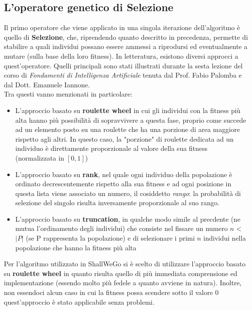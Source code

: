     \subsection{L'operatore genetico di Selezione}
        Il primo operatore che viene applicato in una singola iterazione dell'algoritmo è quello di \textbf{Selezione}, che, riprendendo quanto descritto in precedenza, permette di stabilire a quali individui possano essere ammessi a riprodursi ed eventualmente a mutare (sulla base della loro fitness). In letteratura, esistono diversi approcci a quest'operatore. Quelli principali sono stati illustrati durante la sesta lezione del corso di \textit{Fondamenti di Intelligenza Artificiale} tenuta dal Prof. Fabio Palomba e dal Dott. Emanuele Iannone. \\
        Tra questi vanno menzionati in particolare:

        \begin{itemize}
            \item L'approccio basato su \textbf{roulette wheel} in cui gli individui con la fitness più alta hanno più possibilità di sopravvivere a questa fase, proprio come succede ad un elemento posto su una roulette che ha una porzione di area maggiore rispetto agli altri. In questo caso, la "porzione" di roulette dedicata ad un individuo è direttamente proporzionale al valore della sua fitness (normalizzata in $[0, 1]$)
            \item L'approccio basato su \textbf{rank}, nel quale ogni individuo della popolazione è ordinato decrescentemente rispetto alla sua fitness e ad ogni posizione in questa lista viene associato un numero, il cosiddetto \textit{rango}: la probabilità di selezione del singolo risulta inversamente proporzionale al suo rango.
            \item L'approccio basato su \textbf{truncation}, in qualche modo simile al precdente (ne mutua l'ordinamento degli individui) che consiste nel fissare un numero $n$ < $|P|$ (se P rappresenta la popolazione) e di selezionare i primi $n$ individui nella popolazione che hanno la fitness più alta
        \end{itemize}

        Per l'algoritmo utilizzato in ShallWeGo si è scelto di utilizzare l'approccio basato su \textbf{roulette wheel} in quanto risulta quello di più immediata comprensione ed implementazione (essendo molto più fedele a quanto avviene in natura). Inoltre, non essendoci alcun caso in cui la fitness possa scendere sotto il valore $0$ quest'approccio è stato applicabile senza problemi.

